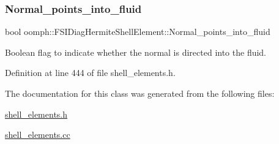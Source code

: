\subsubsection{\texorpdfstring{Normal\+\_\+points\+\_\+into\+\_\+fluid}{Normal\_points\_into\_fluid}}
{\footnotesize\ttfamily bool oomph\+::\+F\+S\+I\+Diag\+Hermite\+Shell\+Element\+::\+Normal\+\_\+points\+\_\+into\+\_\+fluid\hspace{0.3cm}{\ttfamily [private]}}



Boolean flag to indicate whether the normal is directed into the fluid. 



Definition at line 444 of file shell\+\_\+elements.\+h.



The documentation for this class was generated from the following files\+:\begin{DoxyCompactItemize}
\item 
\hyperlink{shell__elements_8h}{shell\+\_\+elements.\+h}\item 
\hyperlink{shell__elements_8cc}{shell\+\_\+elements.\+cc}\end{DoxyCompactItemize}
